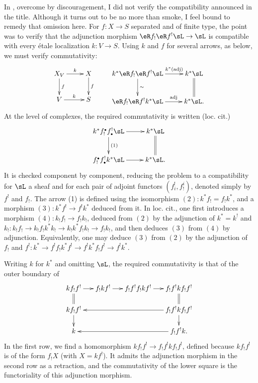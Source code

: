 In \cite[XVIII]{sga4}, overcome by discouragement, I did not verify the
compatibility announced in the title. Although it turns out to be no more
than smoke, I feel bound to remedy that omission here. For $f:X\to S$
separated and of finite type, the point was to verify that the adjunction
morphism $\eR f_!\eR f^!\sL\to \sL$ is compatible with every étale
localization $k:V\to S$. Using $k$ and $f$ for several arrows, as below, we
must verify commutativity:
\[\xymatrix{
  X_V \ar[r]^-k \ar[d]^-f
    & X \ar[d]^-f \\
  V \ar[r]^-k
    & S
} \qquad
\xymatrix{
  k^\ast \eR f_! \eR f^!\sL \ar[r]^-{k^\ast(\text{adj})} \ar[d]^-\sim
    & k^\ast \sL \ar@{=}[d] \\
  \eR f_! \eR f^! k^\ast \sL \ar[r]^-{\text{adj}}
    & k^\ast \sL \text{.}
}\]
At the level of complexes, the required commutativity is written (loc. cit.)
\[\xymatrix{
  k^\ast f_!^\bullet f^!_\bullet \sL \ar[r] \ar[d]^-{(1)}
    & k^\ast \sL \ar@{=}[d] \\
  f_!^\bullet f^!_\bullet k^\ast \sL \ar[r]
    & k^\ast \sL \text{.}
}\]
It is checked component by component, reducing the problem to a
compatibility for $\sL$ a sheaf and for each pair of adjoint functors
$(f_i^!,f_!^i)$, denoted simply by $f^!$ and $f_!$. The arrow (1) is defined
using the isomorphism $(2):k^\ast f_!=f_! k^\ast$, and a morphism
$(3):k^\ast f^! \to f^! k^\ast$ deduced from it. In loc. cit., one first
introduces a morphism $(4):k_! f_!\to f_! k_!$, deduced from $(2)$ by the
adjunction of $k^\ast=k^!$ and
$k_!:k_! f_!\to k_! f_! k^\ast k_!\to k_! k^\ast f_! k_! \to f_! k_!$, and
then deduces $(3)$ from $(4)$ by adjunction. Equivalently, one may deduce
$(3)$ from $(2)$ by the adjunction of $f_!$ and
$f^!:k^\ast \to f^! f_! k^\ast f^!\to f^! k^\ast f_! f^! \to f^! k^\ast$.

Writing $k$ for $k^\ast$ and omitting $\sL$, the required commutativity is
that of the outer boundary of
\[\xymatrix@=.5cm{
  k f_! f^! \ar[r] \ar@{=}[d]
    & f_! k f^! \ar[r]
    & f_! f^! f_! k f^! \ar[r]
    & f_! f^! k f_! f^! \ar@{=}[d] \\
  k f_! f^! \ar[d]
    & & & \ar[lll] f_! f^! k f_! f^! \ar[d] \\
  k
    & & & \ar[lll] f_! f^! k \text{.}
}\]
In the first row, we find a homomorphism
$k f_! f^! \to f_! f^! k f_! f^!$, defined because $k f_! f^!$ is of the
form $f_! X$ (with $X=k f^!$). It admits the adjunction morphism in the
second row as a retraction, and the commutativity of the lower square is the
functoriality of this adjunction morphism.
